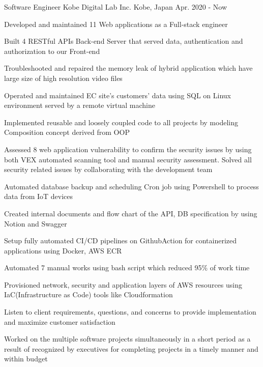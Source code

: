 

\begin{cventries}


  \cventry
    {Software Engineer} %
    {Kobe Digital Lab Inc.} %
    {Kobe, Japan} %
    {Apr. 2020 - Now} %
    {
      \begin{cvitems} %
        \item {Developed and maintained 11 Web applications as a Full-stack engineer}
        \item {Built 4 RESTful APIs Back-end Server that served data, authentication and authorization to our Front-end}
        \item {Troubleshooted and repaired the memory leak of hybrid application which have large size of high resolution video files}
        \item {Operated and maintained EC site's customers' data using SQL on Linux environment served by a remote virtual machine}
        \item {Implemented reusable and loosely coupled code to all projects by modeling Composition concept derived from OOP}
        \item {Assessed 8 web application vulnerability to confirm the security issues by using both VEX automated scanning tool and manual security assessment. Solved all security related issues by collaborating with the development team}
        \item {Automated database backup and scheduling Cron job using Powershell to process data from IoT devices}
        \item {Created internal documents and flow chart of the API, DB specification by using Notion and Swagger}
        \item {Setup fully automated CI/CD pipelines on GithubAction for containerized applications using Docker, AWS ECR}
        \item {Automated 7 manual works using bash script which reduced 95\% of work time}
        \item {Provisioned network, security and application layers of AWS resources using IaC(Infrastructure as Code) tools like Cloudformation}
        \item {Listen to client requirements, questions, and concerns to provide implementation and maximize customer satisfaction}
        \item {Worked on the multiple software projects simultaneously in a short period as a result of recognized by executives for completing projects in a timely manner and within budget}
      \end{cvitems}
}


\end{cventries}